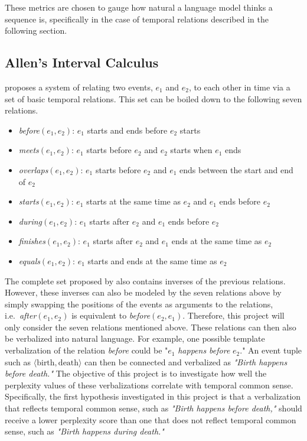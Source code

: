 \documentclass[11pt]{article}
\begin{document}
These metrics are chosen to gauge how natural a language model thinks a sequence is, specifically in the case of temporal relations described in the following section.

\subsection{Allen's Interval Calculus}
\label{sec:allen}
\citet{allen} proposes a system of relating two events, $e_1$ and $e_2$, to each other in time via a set of basic temporal relations. This set can be boiled down to the following seven relations.

\begin{itemize}
  \item \textit{before}$(e_1, e_2)$: $e_1$ starts and ends before $e_2$ starts
  \item \textit{meets}$(e_1, e_2)$: $e_1$ starts before $e_2$ and $e_2$ starts when $e_1$ ends
  \item \textit{overlaps}$(e_1, e_2)$: $e_1$ starts before $e_2$ and $e_1$ ends between the start and end of $e_2$
  \item \textit{starts}$(e_1, e_2)$: $e_1$ starts at the same time as $e_2$ and $e_1$ ends before $e_2$
  \item \textit{during}$(e_1, e_2)$: $e_1$ starts after $e_2$ and $e_1$ ends before $e_2$
  \item \textit{finishes}$(e_1, e_2)$: $e_1$ starts after $e_2$ and $e_1$ ends at the same time as $e_2$
  \item \textit{equals}$(e_1, e_2)$: $e_1$ starts and ends at the same time as $e_2$
\end{itemize}

The complete set proposed by \citet{allen} also contains inverses of the previous relations. However, these inverses can also be modeled by the seven relations above by simply swapping the positions of the events as arguments to the relations, i.e.~\textit{after}$(e_1, e_2)$ is equivalent to \textit{before}$(e_2, e_1)$. Therefore, this project will only consider the seven relations mentioned above. These relations can then also be verbalized into natural language. For example, one possible template verbalization of the relation \textit{before} could be "$e_1$ \textit{happens before} $e_2$." An event tuple such as $\langle \text{birth}, \text{death} \rangle$ can then be connected and verbalized as \textit{"Birth happens before death."} The objective of this project is to investigate how well the perplexity values of these verbalizations correlate with temporal common sense. Specifically, the first hypothesis investigated in this project is that a verbalization that reflects temporal common sense, such as \textit{"Birth happens before death,"} should receive a lower perplexity score than one that does not reflect temporal common sense, such as \textit{"Birth happens during death."}
\end{document}
